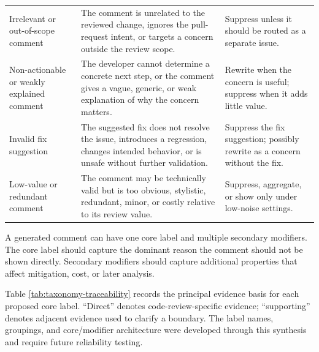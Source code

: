\documentclass[10pt]{article}
\begin{document}
\begin{longtable}{@{}>{\raggedright\arraybackslash}p{}>{\raggedright\arraybackslash}p{}>{\raggedright\arraybackslash}p{}@{}}
Irrelevant or out-of-scope comment & The comment is unrelated to the reviewed change, ignores the pull-request intent, or targets a concern outside the review scope. & Suppress unless it should be routed as a separate issue. \\
Non-actionable or weakly explained comment & The developer cannot determine a concrete next step, or the comment gives a vague, generic, or weak explanation of why the concern matters. & Rewrite when the concern is useful; suppress when it adds little value. \\
Invalid fix suggestion & The suggested fix does not resolve the issue, introduces a regression, changes intended behavior, or is unsafe without further validation. & Suppress the fix suggestion; possibly rewrite as a concern without the fix. \\
Low-value or redundant comment & The comment may be technically valid but is too obvious, stylistic, redundant, minor, or costly relative to its review value. & Suppress, aggregate, or show only under low-noise settings. \\
\end{longtable}
\endgroup

A generated comment can have one core label and multiple secondary modifiers. The core label should capture the dominant reason the comment should not be shown directly. Secondary modifiers should capture additional properties that affect mitigation, cost, or later analysis.

Table \ref{tab:taxonomy-traceability} records the principal evidence basis for each proposed core label. ``Direct'' denotes code-review-specific evidence; ``supporting'' denotes adjacent evidence used to clarify a boundary. The label names, groupings, and core/modifier architecture were developed through this synthesis and require future reliability testing.
\end{document}
